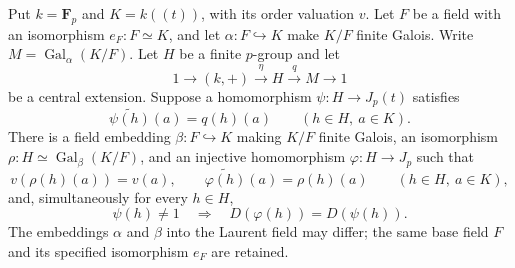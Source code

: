 \begin{theorem}
\label{thm:witt-simultaneous-depth-preserving-central-lift}
\leanok
Put $k=\mathbf F_p$ and $K=k((t))$, with its order valuation $v$.
Let $F$ be a field with an isomorphism $e_F:F\simeq K$, and
let $\alpha:F\hookrightarrow K$ make $K/F$ finite Galois.
Write $M=\operatorname{Gal}_{\alpha}(K/F)$.
Let $H$ be a finite $p$-group and let
\[
 1\longrightarrow(k,+)\xrightarrow{\eta}H
   \xrightarrow{q}M\longrightarrow1
\]
be a central extension. Suppose a homomorphism
$\psi:H\to J_p(t)$ satisfies
\[
 \widetilde{\psi(h)}(a)=q(h)(a)
 \qquad(h\in H,\ a\in K).
\]
There is a field embedding $\beta:F\hookrightarrow K$ making
$K/F$ finite Galois, an isomorphism
$\rho:H\simeq\operatorname{Gal}_{\beta}(K/F)$, and an injective
homomorphism $\varphi:H\to J_p$ such that
\[
 v(\rho(h)(a))=v(a),\qquad
 \widetilde{\varphi(h)}(a)=\rho(h)(a)
 \qquad(h\in H,\ a\in K),
\]
and, simultaneously for every $h\in H$,
\[
 \psi(h)\ne1\quad\Longrightarrow\quad
 D(\varphi(h))=D(\psi(h)).
\]
The embeddings $\alpha$ and $\beta$ into the Laurent field may differ;
the same base field $F$ and its specified isomorphism $e_F$ are retained.
\end{theorem}

